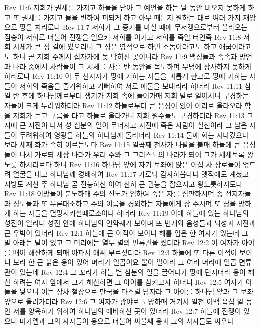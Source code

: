 Rev 11:6  저희가 권세를 가지고 하늘을 닫아 그 예언을 하는 날 동안 비오지 못하게 하고 또 권세를 가지고 물을 변하여 피되게 하고 아무 때든지 원하는 대로 여러 가지 재앙으로 땅을 치리로다
Rev 11:7  저희가 그 증거를 마칠 때에 무저갱으로부터 올라오는 짐승이 저희로 더불어 전쟁을 일으켜 저희를 이기고 저희를 죽일 터인즉
Rev 11:8  저희 시체가 큰 성 길에 있으리니 그 성은 영적으로 하면 소돔이라고도 하고 애굽이라고도 하니 곧 저희 주께서 십자가에 못 박히신 곳이니라
Rev 11:9  백성들과 족속과 방언과 나라 중에서 사람들이 그 시체를 사흘 반 동안을 목도하며 무덤에 장사하지 못하게 하리로다
Rev 11:10  이 두 선지자가 땅에 거하는 자들을 괴롭게 한고로 땅에 거하는 자들이 저희의 죽음을 즐거워하고 기뻐하여 서로 예물을 보내리라 하더라
Rev 11:11  삼일 반 후에 하나님께로부터 생기가 저희 속에 들어가매 저희 발로 일어서니 구경하는 자들이 크게 두려워하더라
Rev 11:12  하늘로부터 큰 음성이 있어 이리로 올라오라 함을 저희가 듣고 구름을 타고 하늘로 올라가니 저희 원수들도 구경하더라
Rev 11:13  그 시에 큰 지진이 나서 성 십분의 일이 무너지고 지진에 죽은 사람이 칠천이라 그 남은 자들이 두려워하여 영광을 하늘의 하나님께 돌리더라
Rev 11:14  둘째 화는 지나갔으나 보라 세째 화가 속히 이르는도다
Rev 11:15  일곱째 천사가 나팔을 불매 하늘에 큰 음성들이 나서 가로되 세상 나라가 우리 주와 그 그리스도의 나라가 되어 그가 세세토록 왕노릇 하시리로다 하니
Rev 11:16  하나님 앞에 자기 보좌에 앉은 이십 사 장로들이 엎드려 얼굴을 대고 하나님께 경배하여
Rev 11:17  가로되 감사하옵나니 옛적에도 계셨고 시방도 계신 주 하나님 곧 전능하신 이여 친히 큰 권능을 잡으시고 왕노릇하시도다
Rev 11:18  이방들이 분노하매 주의 진노가 임하여 죽은 자를 심판하시며 종 선지자들과 성도들과 또 무론대소하고 주의 이름을 경외하는 자들에게 상 주시며 또 땅을 망하게 하는 자들을 멸망시키실때로소이다 하더라
Rev 11:19  이에 하늘에 있는 하나님의 성전이 열리니 성전 안에 하나님의 언약궤가 보이며 또 번개와 음성들과 뇌성과 지진과 큰 우박이 있더라
Rev 12:1  하늘에 큰 이적이 보이니 해를 입은 한 여자가 있는데 그 발 아래는 달이 있고 그 머리에는 열두 별의 면류관을 썼더라
Rev 12:2  이 여자가 아이를 배어 해산하게 되매 아파서 애써 부르짖더라
Rev 12:3  하늘에 또 다른 이적이 보이니 보라 한 큰 붉은 용이 있어 머리가 일곱이요 뿔이 열이라 그 여러 머리에 일곱 면류관이 있는데
Rev 12:4  그 꼬리가 하늘 별 삼분의 일을 끌어다가 땅에 던지더라 용이 해산 하려는 여자 앞에서 그가 해산하면 그 아이를 삼키고자 하더니
Rev 12:5  여자가 아들을 낳으니 이는 장차 철장으로 만국을 다스릴 남자라 그 아이를 하나님 앞과 그 보좌 앞으로 올려가더라
Rev 12:6  그 여자가 광야로 도망하매 거기서 일천 이백 육십 일 동안 저를 양육하기 위하여 하나님의 예비하신 곳이 있더라
Rev 12:7  하늘에 전쟁이 있으니 미가엘과 그의 사자들이 용으로 더불어 싸울쌔 용과 그의 사자들도 싸우나
